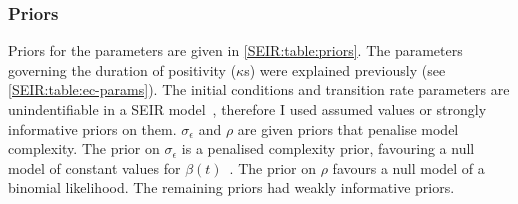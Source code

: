 \documentclass[thesis.tex]{subfiles}
\begin{document}
\subsubsection{Priors} \label{SEIR:sec:priors}

Priors for the parameters are given in \cref{SEIR:table:priors}.
The parameters governing the duration of positivity ($\kappa$s) were explained previously (see \cref{SEIR:table:ec-params}).
The initial conditions and transition rate parameters are unindentifiable in a SEIR model~\autocite{dankwaStructural}, therefore I used assumed values or strongly informative priors on them.
$\sigma_\epsilon$ and $\rho$ are given priors that penalise model complexity.
The prior on $\sigma_\epsilon$ is a penalised complexity prior, favouring a null model of constant values for $\beta(t)$~\autocite{simpsonPenalising}.
The prior on $\rho$ favours a null model of a binomial likelihood.
The remaining priors had weakly informative priors.
\end{document}

